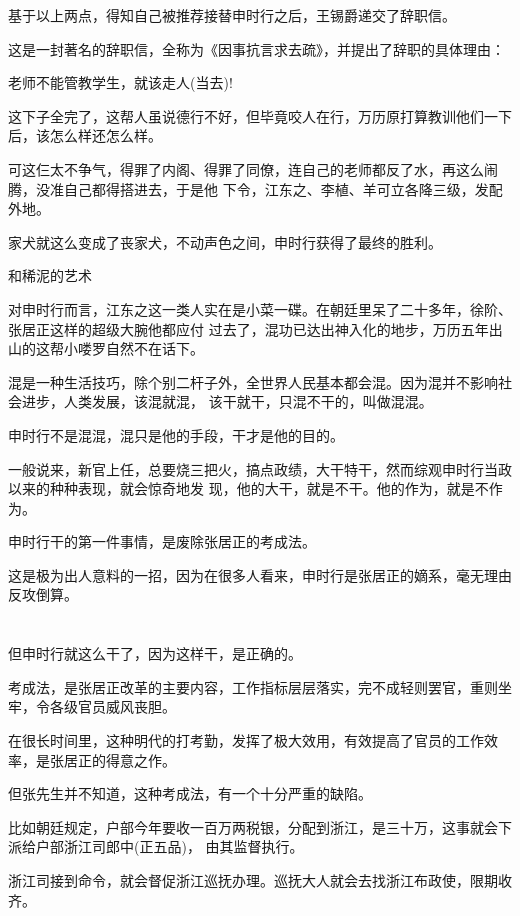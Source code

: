 \documentclass[11pt,a4paper,onecolumn]{article}
\begin{document}
基于以上两点，得知自己被推荐接替申时行之后，王锡爵递交了辞职信。

这是一封著名的辞职信，全称为《因事抗言求去疏》，并提出了辞职的具体理由：

老师不能管教学生，就该走人(当去)!

这下子全完了，这帮人虽说德行不好，但毕竟咬人在行，万历原打算教训他们一下后，该怎么样还怎么样。

可这仨太不争气，得罪了内阁、得罪了同僚，连自己的老师都反了水，再这么闹腾，没准自己都得搭进去，于是他
下令，江东之、李植、羊可立各降三级，发配外地。

家犬就这么变成了丧家犬，不动声色之间，申时行获得了最终的胜利。

和稀泥的艺术

对申时行而言，江东之这一类人实在是小菜一碟。在朝廷里呆了二十多年，徐阶、张居正这样的超级大腕他都应付
过去了，混功已达出神入化的地步，万历五年出山的这帮小喽罗自然不在话下。

混是一种生活技巧，除个别二杆子外，全世界人民基本都会混。因为混并不影响社会进步，人类发展，该混就混，
该干就干，只混不干的，叫做混混。

申时行不是混混，混只是他的手段，干才是他的目的。

一般说来，新官上任，总要烧三把火，搞点政绩，大干特干，然而综观申时行当政以来的种种表现，就会惊奇地发
现，他的大干，就是不干。他的作为，就是不作为。

申时行干的第一件事情，是废除张居正的考成法。

这是极为出人意料的一招，因为在很多人看来，申时行是张居正的嫡系，毫无理由反攻倒算。

\section[\thesection]{}

但申时行就这么干了，因为这样干，是正确的。

考成法，是张居正改革的主要内容，工作指标层层落实，完不成轻则罢官，重则坐牢，令各级官员威风丧胆。

在很长时间里，这种明代的打考勤，发挥了极大效用，有效提高了官员的工作效率，是张居正的得意之作。

但张先生并不知道，这种考成法，有一个十分严重的缺陷。

比如朝廷规定，户部今年要收一百万两税银，分配到浙江，是三十万，这事就会下派给户部浙江司郎中(正五品)，
由其监督执行。

浙江司接到命令，就会督促浙江巡抚办理。巡抚大人就会去找浙江布政使，限期收齐。
\end{document}
